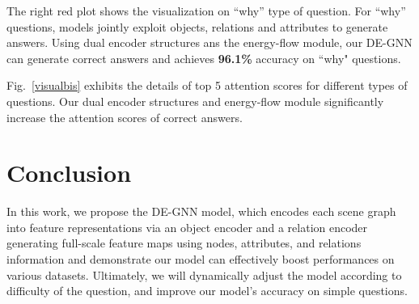\documentclass[letterpaper]{article} %
\begin{document}
The right red plot shows the visualization on ``why'' type of question. 
For ``why'' questions, models jointly exploit objects, relations and attributes to generate answers. 
Using dual encoder structures ans the energy-flow module, our DE-GNN can generate correct answers and achieves \textbf{96.1\%} accuracy on ``why" questions.

Fig.~\ref{visualbis} exhibits the details of top 5 attention scores for different types of questions. 
Our dual encoder structures and energy-flow module significantly increase the attention scores of correct answers.


\section{Conclusion}
In this work, 
we propose the DE-GNN model, which encodes each scene graph into feature representations via an object encoder and a relation encoder generating full-scale feature maps using nodes, attributes, and relations information and demonstrate our model can effectively boost performances on various datasets. 
Ultimately, we will dynamically adjust the model according to difficulty of the question, and improve our model's accuracy on simple questions.


\newpage


\clearpage

\end{document}
